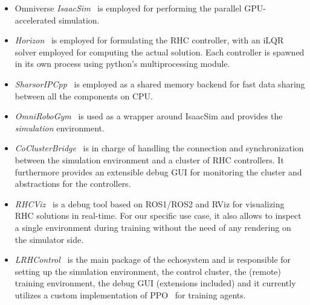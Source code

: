 \begin{itemize}
	\item Omniverse \textit{IsaacSim}~\cite{web::isaacsim} is employed for performing the parallel GPU-accelerated simulation.
	\item \textit{Horizon}~\cite{frameworks::horizon_to} is employed for formulating the RHC controller, with an iLQR solver employed for computing the actual solution. Each controller is spawned in its own process using python's multiprocessing module.
	\item \textit{SharsorIPCpp}~\cite{mystuff::sharsoripcpp} is employed as a shared memory backend for fast data sharing between all the components on CPU.
	\item \textit{OmniRoboGym}~\cite{mystuff::omnirobogym} is used as a wrapper around IsaacSim and provides the \textit{simulation} environment.
	\item \textit{CoClusterBridge}~\cite{mystuff::coclusterbridge} is in charge of handling the connection and synchronization between the simulation environment and a cluster of RHC controllers. It furthermore provides an extensible debug GUI for monitoring the cluster and abstractions for the controllers.
	\item \textit{RHCViz}~\cite{mystuff::rhcviz} is a debug tool based on ROS1/ROS2 and RViz for visualizing RHC solutions in real-time. For our specific use case, it also allows to inspect a single environment during training without the need of any rendering on the simulator side.
	\item \textit{LRHControl}~\cite{mystuff::lrhccontrol} is the main package of the echosystem and is responsible for setting up the simulation environment, the control cluster, the (remote) training environment, the debug GUI (extensions included) and it currently utilizes a custom implementation of PPO~\cite{rl:schulman2017proximal} for training agents.
\end{itemize}




